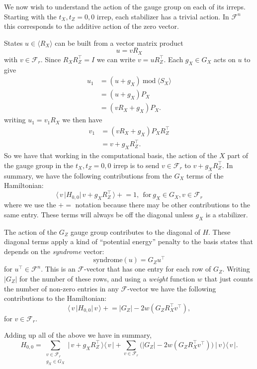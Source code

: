 \documentclass[11pt,oneside]{article}
\newcommand{\todo}[1]{\ \textcolor{red}{\{#1\}}\ }
\newcommand{\pluseq}{\mathrel{+}=}
\newcommand{\bket}[1]{\bigl|\,{#1}\,\bigr\rangle}
\newcommand{\bbra}[1]{\bigl\langle\,{#1}\,\bigr|}
\def\Span#1{\langle #1 \rangle}
\newcommand{\Field}{\mathcal{F}}
\def\Fn{\Field^n}
\def\Frd{\Field_{r}}
\begin{document}
We now wish to understand the action of the
gauge group on each of its irreps.
Starting with the $t_X,t_Z=0,0$ irrep, each stabilizer has a trivial action. 
In $\Fn$ this
corresponds to the additive action of the zero vector.

States $u\in\Span{R_X}$ can be built from a
vector matrix product
$$
    u = v R_X
$$
with $v\in\Frd.$
Since $R_X R_Z^\top = I$
we can write $v = u R_Z^\top.$
Each $g_X\in G_X$ acts on $u$ to give
\begin{align*}
    u_1 &= (u + g_X) \ \mbox{mod}\ \Span{S_X} \\
        &= (u + g_X) P_X \\
        &= (v R_X + g_X) P_X.
\end{align*}
writing $u_1 = v_1 R_X$ we then have
\begin{align*}
    v_1 &= (v R_X + g_X) P_X R_Z^\top \\
        &= v + g_X R_Z^\top.
\end{align*}
So we have that working in the computational
basis, the action of the $X$ part of the
gauge group in the $t_X,t_Z=0,0$ irrep is to send
$v\in \Frd$ to $v + g_X R_Z^\top.$
In summary, we have the following contributions from the
$G_X$ terms of the Hamiltonian:
$$
    \bbra{v} H_{0,0} \bket{v+g_X  R_Z^\top} 
        \pluseq 1,\ \ \mbox{for}\ g_X\in G_X, v\in \Frd
$$
where we use the $\pluseq$ notation
because there may be other contributions to the
same entry.
These terms will always be off
the diagonal unless $g_X$ is a stabilizer.

The action of the $G_Z$ gauge group
contributes to the diagonal of $H.$
These diagonal terms apply a kind of
``potential energy'' penalty
to the basis states
that depends on the \emph{syndrome} vector:
$$
    \mbox{syndrome}(u) = G_Z u^\top
$$
for $u^\top \in \Fn.$
This is an $\Field$-vector that has one entry for
each row of $G_Z.$
Writing $|G_Z|$ for the number of these rows, and 
using a \emph{weight} function $w$ that just counts
the number of non-zero entries in any $\Field$-vector
we have the following contributions to
the Hamiltonian:
$$
    \bbra{v} H_{0,0} \bket{v} 
        \pluseq |G_Z| - 2w(G_Z R_X^\top v^\top),
$$
for $v\in \Frd.$

Adding up all of the above we
have in summary,
\begin{equation}\label{hamblockgs}
H_{0,0} = \sum_{\substack{v\in\Frd\\g_X\in G_X } }
  \bket{v+g_X  R_Z^\top}\bbra{v} 
  + \sum_{v\in\Frd} \bigl(|G_Z| - 2w(G_Z R_X^\top v^\top)
    \bigr) \ \bket{v}\bbra{v}.
\end{equation}
\end{document}
